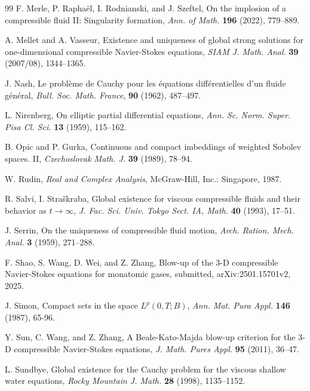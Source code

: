 \documentclass[11pt,reqno]{amsart}
\numberwithin{rk}{section}
\numberwithin{prop}{section}
\numberwithin{mydef}{section}
\numberwithin{lem}{section}
\numberwithin{equation}{section}
\numberwithin{thm}{section}
\begin{document}
\begin{thebibliography}{99}
 F.	Merle, P. Rapha\"el,  I. Rodnianski, and  J. Szeftel,  On the implosion of a compressible fluid II: Singularity formation,  \textit{ Ann. of Math.}  \textbf{196} (2022),  779--889.



 A. Mellet and A. Vasseur, Existence and uniqueness of global strong solutions for one-dimensional compressible Navier-Stokes equations, \textit{SIAM J. Math. Anal.} \textbf{39} (2007/08), 1344--1365.


 J. Nash, Le probl\`eme de Cauchy pour les {\'e}quations diff{\'e}rentielles d'un fluide g{\'e}n{\'e}ral, \textit{Bull. Soc. Math. France}, \textbf {90} (1962), 487--497.
 
 
 L. Nirenberg, On elliptic partial differential equations, \textit{Ann. Sc. Norm. Super. Pisa Cl. Sci.} \textbf{13} (1959), 115--162.


 B. Opic and P. Gurka, Continuous and compact imbeddings of weighted Sobolev spaces. II, \textit{Czechoslovak Math. J.} \textbf{39} (1989), 78--94.




 W. Rudin, \textit{Real and Complex Analysis}, McGraw-Hill, Inc.: Singapore, 1987.


 R. Salvi, I. Straškraba, Global existence for viscous compressible fluids and their behavior as $t\to \infty$, \textit{J. Fac. Sci. Univ. Tokyo Sect. IA, Math.} \textbf{40} (1993), 17--51.



 J. Serrin, On the uniqueness of compressible fluid motion,  \textit{Arch. Ration. Mech. Anal.} \textbf{3} (1959), 271--288.


 F. Shao, S. Wang, D. Wei, and Z. Zhang, Blow-up of the 3-D compressible Navier-Stokes equations for monatomic gases,  submitted, arXiv:2501.15701v2, 2025. 

 J. Simon, Compact sets in the space $L^p(0,T;B)$, \textit{Ann. Mat. Pura Appl.} \textbf{ 146} (1987), 65-96.


 Y. Sun, C. Wang, and Z. Zhang, A Beale-Kato-Majda blow-up criterion for the 3-D compressible Navier-Stokes equations, \textit{J. Math. Pures Appl.} \textbf{95} (2011), 36--47.


 L. Sundbye, Global existence for the Cauchy problem for the viscous shallow water equations, \textit{ Rocky Mountain J. Math.} \textbf{28} (1998),  1135--1152.


\end{thebibliography}
\end{document}
